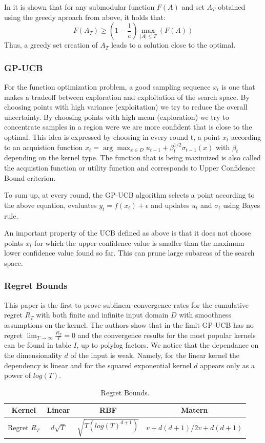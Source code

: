 \documentclass[10pt,journal,a4paper]{IEEEtran}
\begin{document}
In \cite{nemhauser1978analysis} it is shown that for any submodular function $F(A)$ and set
$A_T$ obtained using the greedy aproach from above, it holds that:
\begin{equation}
	F(A_T) \geq (1-\frac{1}{e}) \max_{|A| \leq T}(F(A))
\end{equation}
Thus, a greedy set creation of $A_T$ leads to a solution close to the optimal.

\subsubsection{GP-UCB}
For the function optimization problem, a good sampling sequence $x_t$ is one that makes a tradeoff between 
exploration and exploitation of the search space. By choosing points with high variance (exploitation) we try to reduce the overall uncertainty.
By choosing points with high mean (exploration) we try to concentrate samples in a region were we are more confident that is close to the optimal. This idea is expressed by choosing in every round t, a point $x_t$  according to an acquistion function 
$x_t = \arg\max_{x\in D} u_{t-1} + \beta_{t}^{1/2}\sigma_{t-1}(x)$ with $\beta_{t}$ depending on the kernel type. The function that is being maximized is also called the acquistion function or utility function and corresponds to Upper Confidence Bound criterion.

To sum up, at every round, the GP-UCB algorithm selects a point according to the above equation, evaluates $y_t=f(x_t) + \epsilon$ and updates $u_t$ and $\sigma_t$ using Bayes rule.

An important property of the UCB defined as above is that it does not choose points $x_t$ for which the upper confidence value is smaller than the maximum lower confidence value found so far. This can prune large subareas of the search space.

\subsubsection{Regret Bounds}

This paper is the first to prove sublinear convergence rates for the cumulative regret $R_T$ with both finite and infinite input domain $D$ with smoothness assumptions on the kernel. The authors show that in the limit GP-UCB has no regret $\lim_{T\to\infty} \frac{R_T}{T}= 0$ and the convergence results for the most popular kernels can be found in table $I$, up to polylog factors. We notice that the dependance on the dimensionality $d$ of the input is weak. Namely, for the linear kernel the dependency is linear and for the squared exponential kernel $d$ appears only as a power of $log(T)$.
\begin{table}
\begin{tabular}{|c||c|c|c|}
\hline
Kernel & Linear & RBF & Matern\\
\hline
Regret $R_T$ & $d\sqrt{T}$& $\sqrt{T(log(T)^{d+1})} $ &${v+d(d+1)/2v+d(d+1)}$\\
\hline
\end{tabular}
\label{bounds}
\caption{Regret Bounds.}
\end{table}
\end{document}
